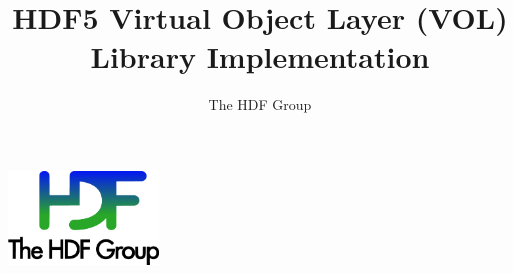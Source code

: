 \documentclass[10pt,a4paper]{article}
\title{HDF5 Virtual Object Layer (VOL)\\
    Library Implementation}
\author{The HDF Group}
\begin{document}
\maketitle
\thispagestyle{empty}

\vfill
\begin{center}
\includegraphics[width=4cm]{THG_LOGO.pdf} %
\end{center}
\vfill
\vfill

\newpage
{}
\tableofcontents
\newpage


\renewcommand\appendixtocname{Appendix}


\newpage









\end{document}
